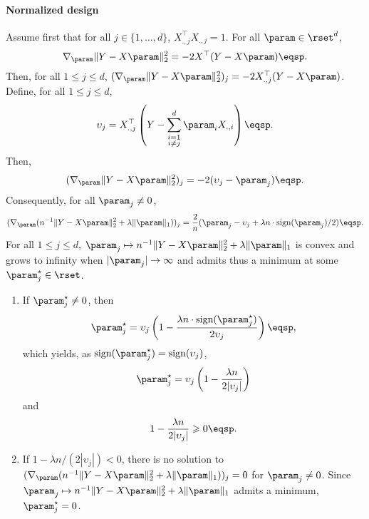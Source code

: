\paragraph{{\bf Normalized design} } Assume first that for all $j\in\{1,\ldots,d\}$,  $X_{.,j}^\top X_{.,j} = 1$. 
For all $\param \in \rset^d$, 
\[
\nabla_\param \|Y - X\param\|_2^2 = - 2 X^\top (Y-X\param)\eqsp.
\]
Then, for all $1\leqslant j \leqslant d$, $(\nabla_\param \|Y - X\param\|_2^2)_j = -2 X_{.,j}^\top (Y-X\param)$. 
Define, for all $1\leqslant j \leqslant d$,
\[
\upsilon_{j}=X_{.,j}^\top\left(Y-\sum_{\substack{i=1\\ i\neq j}}^d\param_{i} X_{.,i}\right)\eqsp.
\]
Then,
\[
(\nabla_\param \|Y - X\param\|_2^2)_j = -2( \upsilon_j - \param_j)\eqsp.
\]
Consequently, for all $\param_j \neq 0$, 
\[
(\nabla_\param ( n^{-1}\|Y - X\param\|_2^2 +  \lambda\|\param\|_1))_j= \frac{2}{n}( \param_j - \upsilon_j + \lambda n\cdot\textrm{sign}(\param_j)/2)\eqsp.
\]
For all $1\leqslant j\leqslant d$,  $\param_j \mapsto  n^{-1}\|Y - X\param\|_2^2 + \lambda\|\param\|_1$ is convex and grows to infinity when $|\param_j|\to \infty$ and admits thus a minimum at some $\param_j^{\star}\in\rset$. 
\begin{enumerate}[-]
\item If $\param_j^{\star} \neq 0$, then
\[
\param_j^{\star} = \upsilon_j\left( 1 - \frac{\lambda n\cdot\textrm{sign}(\param_j^{\star})}{2 \upsilon_j}\right)\eqsp,
\]
which yields, as  $\textrm{sign}(\param_j^{\star}) = \textrm{sign}(\upsilon_j)$,
\[
\param_j^{\star} = \upsilon_j\left(1 - \frac{\lambda n }{2 |\upsilon_j|}\right)
\]
and
\[
1 - \frac{\lambda n }{2 |\upsilon_j|} \geqslant 0\eqsp.
\]
\item If $1 - \lambda n/(2 |\upsilon_j|)<0$, there is no solution to $(\nabla_\param ( n^{-1}\|Y - X\param\|_2^2 +  \lambda\|\param\|_1))_j=0$ for $\param_j \neq 0$.  Since $\param_j \mapsto  n^{-1}\|Y - X\param\|_2^2 + \lambda\|\param\|_1$ admits a minimum, $\param_j^{\star}=0$. 
\end{enumerate}
